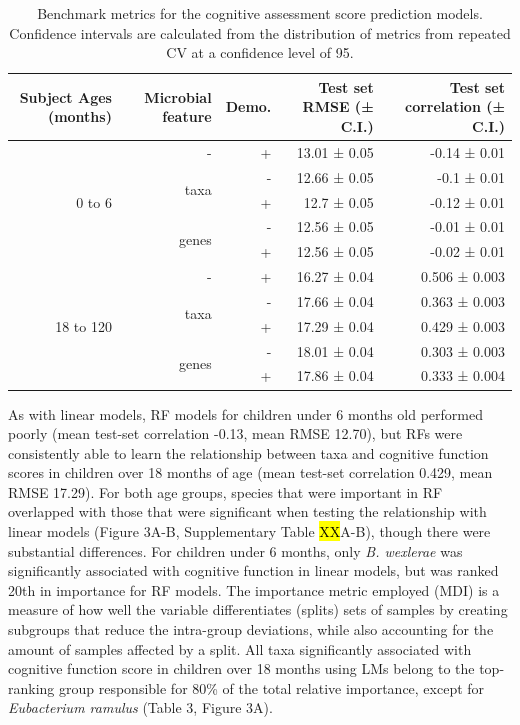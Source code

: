 \documentclass{article}
\begin{document}
\begin{table}[!h]
    \begin{center}
    \begin{tabular}{|r|r|r|r|r|}
      \hline\hline
      \textbf{Subject Ages (months)} & \textbf{Microbial feature} & \textbf{Demo.} & \textbf{Test set RMSE (± C.I.)} & \textbf{Test set correlation (± C.I.)} \\\hline
      \multirow{5}{*}{0 to 6} & - & + & 13.01 ± 0.05 & -0.14 ± 0.01 \\ \cline{2-5}
            & \multirow{2}{*}{taxa} & - & 12.66 ± 0.05 & -0.1 ± 0.01 \\ \cline{3-5}
            &       & + & 12.7 ± 0.05 & -0.12 ± 0.01 \\ \cline{2-5}
            & \multirow{2}{*}{genes} & - & 12.56 ± 0.05 & -0.01 ± 0.01 \\ \cline{3-5}
            &       & + & 12.56 ± 0.05 & -0.02 ± 0.01 \\ \cline{1-5}
      \multirow{5}{*}{18 to 120} & - & + & 16.27 ± 0.04 & 0.506 ± 0.003 \\ \cline{2-5}
            & \multirow{2}{*}{taxa} & - & 17.66 ± 0.04 & 0.363 ± 0.003 \\ \cline{3-5}
            &       & + & 17.29 ± 0.04 & 0.429 ± 0.003 \\ \cline{2-5}
            & \multirow{2}{*}{genes} & - & 18.01 ± 0.04 & 0.303 ± 0.003 \\ \cline{3-5}
            &       & + & 17.86 ± 0.04 & 0.333 ± 0.004 \\\hline\hline
    \end{tabular}
    \caption{\label{tab:rfbench}Benchmark metrics for the cognitive assessment score
    prediction models. Confidence intervals are calculated from the
    distribution of metrics from repeated CV at a confidence level of 95.}
    \end{center}
\end{table}

As with linear models, RF models for children under 6 months old
performed poorly (mean test-set correlation -0.13, mean RMSE 12.70),
but RFs were consistently able to learn the relationship between taxa
and cognitive function scores in children over 18 months of age (mean
test-set correlation 0.429, mean RMSE 17.29). For both age groups,
species that were important in RF overlapped with those that were
significant when testing the relationship with linear models (Figure
3A-B, Supplementary Table \hl{XX}A-B), though there were substantial
differences. For children under 6 months, only \emph{B. wexlerae} was
significantly associated with cognitive function in linear models, but
was ranked 20th in importance for RF models. The importance metric
employed (MDI) is a measure of how well the variable differentiates
(splits) sets of samples by creating subgroups that reduce the
intra-group deviations, while also accounting for the amount of samples
affected by a split. All taxa significantly associated with cognitive
function score in children over 18 months using LMs belong to the
top-ranking group responsible for 80\% of the total relative importance,
except for \emph{Eubacterium ramulus} (Table 3, Figure 3A).
\end{document}

